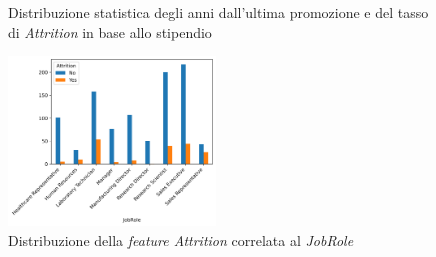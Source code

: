 \begin{figure}[H]
	\centering
	\quad
	    \setlength{\belowcaptionskip}{-10pt}

	\caption{Distribuzione statistica degli anni dall'ultima promozione e del tasso di \textit{Attrition} in base allo stipendio}
	\label{GraficiPromozioneLavoro}
\end{figure}

\vspace{2em}

\begin{figure}
    \includegraphics[width=0.49\textwidth]{Immagini/attritionRuolo.png}
    \setlength{\belowcaptionskip}{-10pt}
    \caption{Distribuzione della \textit{\textit{feature} Attrition} correlata al \textit{JobRole}}
     \clearpage
    \label{attritionJobRole}
\end{figure}

